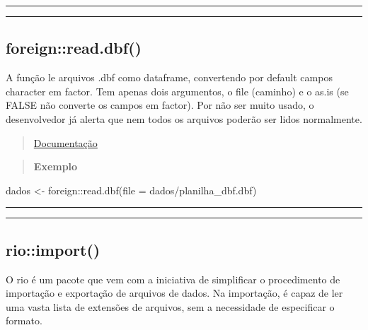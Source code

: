 \documentclass[
]{book}
\newenvironment{Shaded}{\begin{snugshade}}{\end{snugshade}}
\newcommand{\AttributeTok}[1]{\textcolor[rgb]{0.77,0.63,0.00}{#1}}
\newcommand{\FunctionTok}[1]{\textcolor[rgb]{0.00,0.00,0.00}{#1}}
\newcommand{\NormalTok}[1]{#1}
\newcommand{\OtherTok}[1]{\textcolor[rgb]{0.56,0.35,0.01}{#1}}
\newcommand{\SpecialCharTok}[1]{\textcolor[rgb]{0.00,0.00,0.00}{#1}}
\newcommand{\StringTok}[1]{\textcolor[rgb]{0.31,0.60,0.02}{#1}}
\theoremstyle{definition}
\theoremstyle{definition}
\theoremstyle{definition}
\theoremstyle{definition}
\theoremstyle{remark}
\begin{document}
\begin{center}\rule{0.5\linewidth}{0.5pt}\end{center}

\begin{center}\rule{0.5\linewidth}{0.5pt}\end{center}

\hypertarget{foreignread.dbf}{%
\subsection{foreign::read.dbf()}\label{foreignread.dbf}}

A função le arquivos .dbf como dataframe, convertendo por default campos character em factor. Tem apenas dois argumentos, o file (caminho) e o as.is (se FALSE não converte os campos em factor). Por não ser muito usado, o desenvolvedor já alerta que nem todos os arquivos poderão ser lidos normalmente.

\begin{quote}
\href{https://www.rdocumentation.org/packages/foreign/versions/0.8-82/topics/read.dbf}{Documentação}
\end{quote}

\begin{quote}
\textbf{Exemplo}
\end{quote}

\begin{Shaded}
\begin{Highlighting}[]
\NormalTok{dados }\OtherTok{\textless{}{-}}\NormalTok{ foreign}\SpecialCharTok{::}\FunctionTok{read.dbf}\NormalTok{(}\AttributeTok{file =} \StringTok{\textquotesingle{}dados/planilha\_dbf.dbf\textquotesingle{}}\NormalTok{)}
\end{Highlighting}
\end{Shaded}

\begin{center}\rule{0.5\linewidth}{0.5pt}\end{center}

\begin{center}\rule{0.5\linewidth}{0.5pt}\end{center}

\hypertarget{rioimport}{%
\subsection{rio::import()}\label{rioimport}}

O rio é um pacote que vem com a iniciativa de simplificar o procedimento de importação e exportação de arquivos de dados. Na importação, é capaz de ler uma vasta lista de extensões de arquivos, sem a necessidade de especificar o formato.
\end{document}
